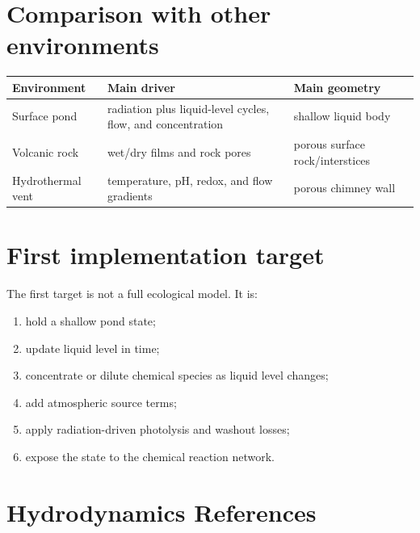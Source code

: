 \documentclass[11pt]{article}
\begin{document}
\section{Comparison with other environments}

\begin{longtable}{lll}
\toprule
Environment & Main driver & Main geometry \\
\midrule
Surface pond & radiation plus liquid-level cycles, flow, and concentration & shallow liquid body \\
Volcanic rock & wet/dry films and rock pores & porous surface rock/interstices \\
Hydrothermal vent & temperature, pH, redox, and flow gradients & porous chimney wall \\
\bottomrule
\end{longtable}

\section{First implementation target}

The first target is not a full ecological model. It is:
\begin{enumerate}
  \item hold a shallow pond state;
  \item update liquid level in time;
  \item concentrate or dilute chemical species as liquid level changes;
  \item add atmospheric source terms;
  \item apply radiation-driven photolysis and washout losses;
  \item expose the state to the chemical reaction network.
\end{enumerate}

\section{Hydrodynamics References}
\end{document}
